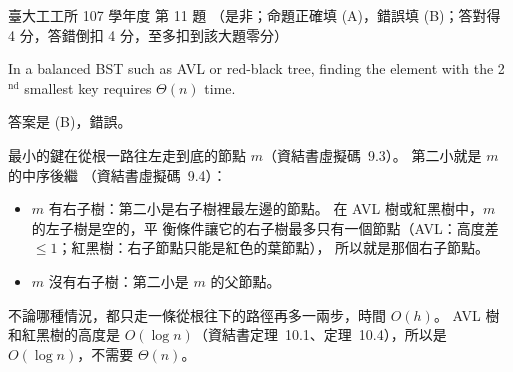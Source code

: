 \begin{pastexam}[label={px:ntu-107-ie-ds-11}]{臺大工工所 107 學年度 第 11 題}
（是非；命題正確填 (A)，錯誤填 (B)；答對得 4 分，答錯倒扣 4 分，至多扣到該大題零分）

In a balanced BST such as AVL or red-black tree, finding the element with the 2$^{\text{nd}}$ smallest key requires $\Theta(n)$ time.
\end{pastexam}

\begin{pastsoln}
答案是 (B)，錯誤。

最小的鍵在從根一路往左走到底的節點 $m$（資結書虛擬碼~9.3）。 第二小就是 $m$ 的中序後繼
（資結書虛擬碼~9.4）：
\begin{itemize}
\item $m$ 有右子樹：第二小是右子樹裡最左邊的節點。 在 AVL 樹或紅黑樹中，$m$ 的左子樹是空的，平
衡條件讓它的右子樹最多只有一個節點（AVL：高度差 $\le 1$；紅黑樹：右子節點只能是紅色的葉節點），
所以就是那個右子節點。
\item $m$ 沒有右子樹：第二小是 $m$ 的父節點。
\end{itemize}
不論哪種情況，都只走一條從根往下的路徑再多一兩步，時間 $O(h)$。 AVL 樹和紅黑樹的高度是
$O(\log n)$（資結書定理~10.1、定理~10.4），所以是 $O(\log n)$，不需要 $\Theta(n)$。
\end{pastsoln}
